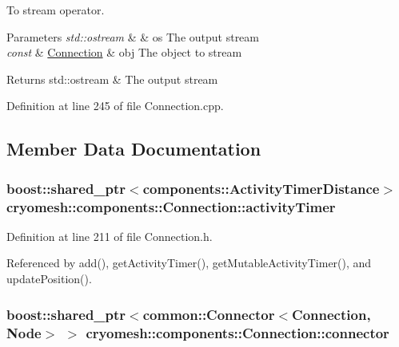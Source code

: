 \-To stream operator. 


\begin{DoxyParams}{\-Parameters}
{\em std\-::ostream} & \& os \-The output stream \\
\hline
{\em const} & \hyperlink{classcryomesh_1_1components_1_1Connection}{\-Connection} \& obj \-The object to stream\\
\hline
\end{DoxyParams}
\begin{DoxyReturn}{\-Returns}
std\-::ostream \& \-The output stream 
\end{DoxyReturn}


\-Definition at line 245 of file \-Connection.\-cpp.



\subsection{\-Member \-Data \-Documentation}
\hypertarget{classcryomesh_1_1components_1_1Connection_aec487280dd02b018049b7a1dd6906861}{
\subsubsection[{activity\-Timer}]{\setlength{\rightskip}{0pt plus 5cm}boost\-::shared\-\_\-ptr$<${\bf components\-::\-Activity\-Timer\-Distance}$>$ {\bf cryomesh\-::components\-::\-Connection\-::activity\-Timer}}}\label{classcryomesh_1_1components_1_1Connection_aec487280dd02b018049b7a1dd6906861}


\-Definition at line 211 of file \-Connection.\-h.



\-Referenced by add(), get\-Activity\-Timer(), get\-Mutable\-Activity\-Timer(), and update\-Position().

\hypertarget{classcryomesh_1_1components_1_1Connection_ab6d2d5386a6fe3dc5e5797a0b131ea15}{
\subsubsection[{connector}]{\setlength{\rightskip}{0pt plus 5cm}boost\-::shared\-\_\-ptr$<${\bf common\-::\-Connector}$<${\bf \-Connection}, {\bf \-Node}$>$ $>$ {\bf cryomesh\-::components\-::\-Connection\-::connector}}}\label{classcryomesh_1_1components_1_1Connection_ab6d2d5386a6fe3dc5e5797a0b131ea15}


